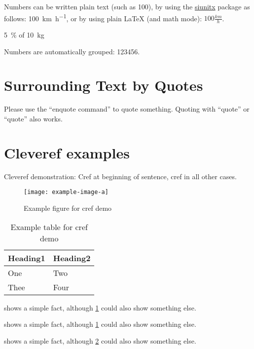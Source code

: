 \documentclass[
  fontsize=10pt,
  numbers=noenddot,
  english,  %
  paper=a5,
  twoside,  %
  DIV=calc,
  headings=small,
  bibliography=totoc,
  listof=totoc,
  draft=false
]{scrbook}
\theoremstyle{break}
\begin{document}
\begin{ltgexample}
Numbers can be written plain text (such as 100), by using the \href{https://ctan.org/pkg/siunitx}{siunitx} package as follows:
\SI{100}{\km\per\hour},
or by using plain \LaTeX{} (and math mode):
$100 \frac{\mathit{km}}{h}$.
\end{ltgexample}

\begin{ltgexample}
\SI{5}{\percent} of \SI{10}{kg}
\end{ltgexample}

\begin{ltgexample}
Numbers are automatically grouped: \num{123456}.
\end{ltgexample}

\section{Surrounding Text by Quotes}

\begin{ltgexample}
Please use the \enquote{enquote command} to quote something.
Quoting with "`quote"' or ``quote'' also works.

\end{ltgexample}

\section{Cleveref examples}
\label{sec:ex:cref}

Cleveref demonstration: Cref at beginning of sentence, cref in all other cases.

\begin{figure}
  \centering
  \texttt{[image: example-image-a]}
  \caption{Example figure for cref demo}
  \label{fig:ex:cref}
\end{figure}

\begin{table}
  \centering
  \begin{tabular}{ll}
    \toprule
    Heading1 & Heading2 \\
    \midrule
    One      & Two      \\
    Thee     & Four     \\
    \bottomrule
  \end{tabular}
  \caption{Example table for cref demo}
  \label{tab:ex:cref}
\end{table}

\begin{ltgexample}
 shows a simple fact, although \cref{fig:ex:cref} could also show something else.

 shows a simple fact, although \cref{tab:ex:cref} could also show something else.

 shows a simple fact, although \cref{sec:ex:cref} could also show something else.
\end{ltgexample}
\end{document}
